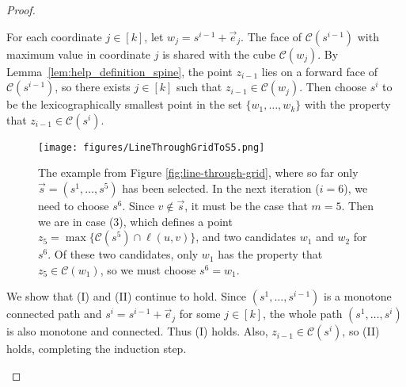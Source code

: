 \documentclass[11pt]{article}
\begin{document}
\begin{proof}
\begin{description}
    For each coordinate $j \in [k]$, let $w_j = s^{i-1} + \vec{e}_j$. The  face of $\mathcal{C}(s^{i-1})$ with maximum value in coordinate $j$ is shared with the cube $\mathcal{C}(w_j)$. By Lemma~\ref{lem:help_definition_spine}, the point $z_{i-1}$ lies on a forward face of $\mathcal{C}({s^{i-1}})$, so there exists $j \in [k]$ such that  $z_{i-1} \in \mathcal{C}(w_j)$. Then choose $s^{i}$ to be the lexicographically smallest point in the set $\{w_1, \ldots, w_k\}$ with the property that $z_{i-1} \in \mathcal{C}(s^{i})$. 

\begin{figure}[h!]
\centering 
\texttt{[image: figures/LineThroughGridToS5.png]}
\caption{%
The example from Figure \ref{fig:line-through-grid}, where so far only $\vec{s} = (s^1, \ldots, s^5)$ has been selected. In the next iteration ($i=6$),  we need to choose $s^6$. Since $v \not \in \vec{s}$, it must be the case that $m =5$. Then we are in case (3), which defines a  point $z_5 = \max \{\mathcal{C}({s^{5}}) \cap \ell(u, v)\}$, and two candidates $w_1$ and $w_2$ for $s^6$. Of these two candidates, only $w_1$ has the property that $z_5 \in \mathcal{C}(w_1)$, so %
we must choose $s^6 = w_1$. }
\end{figure}
    
 We  show that (I) and (II) continue to hold. Since $(s^1, \ldots, s^{i-1})$ is a monotone connected path and $s^i = s^{i-1} + \vec{e}_j$ for some $j \in [k]$, the whole path $(s^1, \ldots, s^i)$ is also monotone and connected. Thus (I) holds. Also, $z_{i-1} \in \mathcal{C}(s^i)$, so (II) holds, completing the induction step.
 \end{description}


\end{proof}
\end{document}
